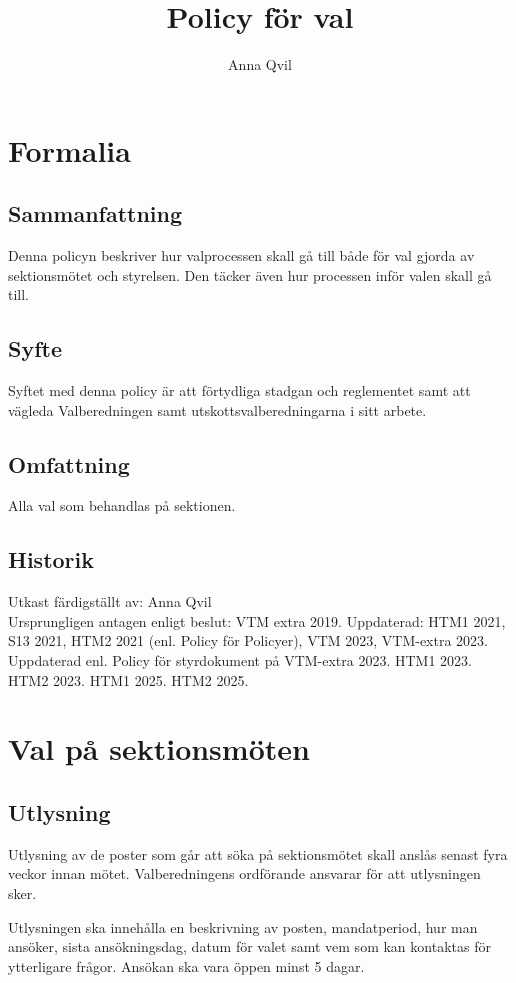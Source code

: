 \documentclass{dsekprotokoll}
\title{Policy för val}
\author{Anna Qvil}
\begin{document}
\maketitle
\section{Formalia}
\subsection{Sammanfattning}
Denna policyn beskriver hur valprocessen skall gå till både för val gjorda av sektionsmötet och styrelsen. Den täcker även hur processen inför valen skall gå till.

\subsection{Syfte}
Syftet med denna policy är att förtydliga stadgan och reglementet samt att vägleda Valberedningen samt utskottsvalberedningarna i sitt arbete.

\subsection{Omfattning}
Alla val som behandlas på sektionen.

\subsection{Historik}
Utkast färdigställt av: Anna Qvil \\
Ursprungligen antagen enligt beslut: VTM extra 2019.
Uppdaterad: HTM1 2021, S13 2021, HTM2 2021 (enl. Policy för Policyer), VTM 2023, VTM-extra 2023. Uppdaterad enl. Policy för styrdokument på VTM-extra 2023. HTM1 2023. HTM2 2023. HTM1 2025. HTM2 2025.


\section{Val på sektionsmöten}

\subsection{Utlysning}
Utlysning av de poster som går att söka på sektionsmötet skall anslås senast fyra veckor innan mötet. Valberedningens ordförande ansvarar för att utlysningen sker.

Utlysningen ska innehålla en beskrivning av posten, mandatperiod, hur man ansöker, sista  ansökningsdag, datum för valet samt vem som kan kontaktas för ytterligare frågor. Ansökan ska vara öppen minst 5 dagar.
\end{document}
